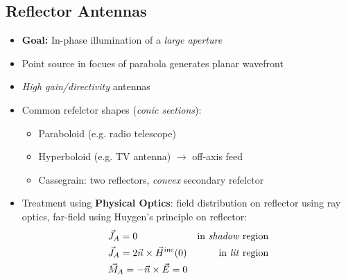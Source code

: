 \subsection{Reflector Antennas}
\begin{itemize}
    \itemsep0pt
    \item \textbf{Goal:} In-phase illumination of a \textit{large aperture}
    \item Point source in focues of parabola generates planar wavefront
    \item \textit{High gain/directivity} antennas
    \item Common refelctor shapes (\textit{conic sections}):
        \begin{itemize}
            \itemsep0pt
            \item Paraboloid (e.g. radio telescope)
            \item Hyperboloid (e.g. TV antenna) $\to$ off-axis feed
            \item Cassegrain: two reflectors, \textit{convex} secondary refelctor
        \end{itemize}
    \item Treatment using \textbf{Physical Optics}: field distribution on reflector using ray optics, far-field using Huygen's principle on reflector:
        \begin{align*}
            &\vec{J}_A = 0 &\text{in \textit{shadow} region}\\
            &\vec{J}_A = 2\vec{n} \times\vec{H}^{\mathrm{inc}}(0) &\text{in \textit{lit} region}\\
            &\vec{M}_A = -\vec{n}\times\vec{E} = 0
        \end{align*}
\end{itemize}
